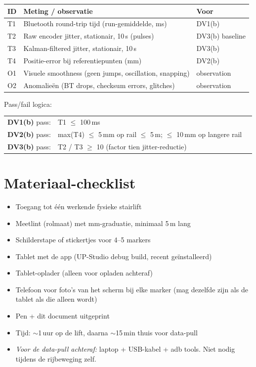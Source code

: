 \documentclass[11pt, a4paper]{article}
\begin{document}
\begin{table}[h]
\small
\begin{tabular}{@{}lll@{}}
\toprule
\textbf{ID} & \textbf{Meting / observatie} & \textbf{Voor} \\
\midrule
T1 & Bluetooth round-trip tijd (run-gemiddelde, ms)        & DV1(b) \\
T2 & Raw encoder jitter, stationair, 10\,s (pulses)        & DV3(b) baseline \\
T3 & Kalman-filtered jitter, stationair, 10\,s             & DV3(b) \\
T4 & Positie-error bij referentiepunten (mm)               & DV2(b) \\
O1 & Visuele smoothness (geen jumps, oscillation, snapping)& observation \\
O2 & Anomalieën (BT drops, checksum errors, glitches)      & observation \\
\bottomrule
\end{tabular}
\end{table}

Pass/fail logica:

\begin{tabular}{@{}lll@{}}
\textbf{DV1(b)} pass: & T1 $\leq$ 100\,ms \\
\textbf{DV2(b)} pass: & max(T4) $\leq$ 5\,mm op rail $\leq$ 5\,m; $\leq$ 10\,mm op langere rail \\
\textbf{DV3(b)} pass: & T2 / T3 $\geq$ 10 (factor tien jitter-reductie) \\
\end{tabular}

\section{Materiaal-checklist}

\begin{itemize}[leftmargin=2em, label=$\square$]
  \item Toegang tot één werkende fysieke stairlift
  \item Meetlint (rolmaat) met mm-graduatie, minimaal 5\,m lang
  \item Schilderstape of stickertjes voor 4--5 markers
  \item Tablet met de app (UP-Studio debug build, recent geïnstalleerd)
  \item Tablet-oplader (alleen voor opladen achteraf)
  \item Telefoon voor foto's van het scherm bij elke marker (mag dezelfde
        zijn als de tablet als die alleen wordt)
  \item Pen + dit document uitgeprint
  \item Tijd: $\sim$1\,uur op de lift, daarna $\sim$15\,min thuis voor data-pull
  \item \emph{Voor de data-pull achteraf:} laptop + USB-kabel + adb tools.
        Niet nodig tijdens de rijbeweging zelf.
\end{itemize}
\end{document}
